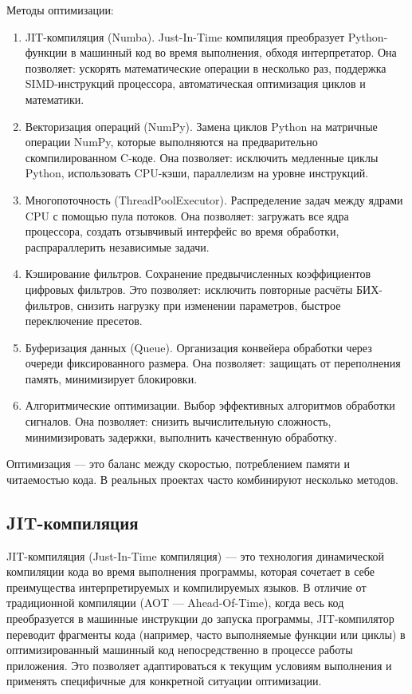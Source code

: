 Методы оптимизации:
\begin{enumerate}
	\item JIT-компиляция (Numba). Just-In-Time компиляция преобразует Python-функции в машинный код во время выполнения, обходя интерпретатор. Она позволяет: ускорять математические операции в несколько раз, поддержка SIMD-инструкций процессора, автоматическая оптимизация циклов и математики.
	\item Векторизация операций (NumPy). Замена циклов Python на матричные операции NumPy, которые выполняются на предварительно скомпилированном C-коде. Она позволяет: исключить медленные циклы Python, использовать CPU-кэши, параллелизм на уровне инструкций.
	\item Многопоточность (ThreadPoolExecutor). Распределение задач между ядрами CPU с помощью пула потоков. Она позволяет: загружать все ядра процессора, создать отзывчивый интерфейс во время обработки, распрараллерить независимые задачи.
	\item Кэширование фильтров. Сохранение предвычисленных коэффициентов цифровых фильтров. Это позволяет: исключить повторные расчёты БИХ-фильтров, снизить нагрузку при изменении параметров, быстрое переключение пресетов.
	\item Буферизация данных (Queue). Организация конвейера обработки через очереди фиксированного размера. Она позволяет: защищать от переполнения память, минимизирует блокировки.
	\item Алгоритмические оптимизации. Выбор эффективных алгоритмов обработки сигналов. Она позволяет: снизить вычислительную сложность, минимизировать задержки, выполнить качественную обработку.
\end{enumerate}

Оптимизация — это баланс между скоростью, потреблением памяти и читаемостью кода. В реальных проектах часто комбинируют несколько методов.

\subsection{JIT-компиляция}

JIT-компиляция (Just-In-Time компиляция) — это технология динамической компиляции кода во время выполнения программы, которая сочетает в себе преимущества интерпретируемых и компилируемых языков. В отличие от традиционной компиляции (AOT — Ahead-Of-Time), когда весь код преобразуется в машинные инструкции до запуска программы, JIT-компилятор переводит фрагменты кода (например, часто выполняемые функции или циклы) в оптимизированный машинный код непосредственно в процессе работы приложения. Это позволяет адаптироваться к текущим условиям выполнения и применять специфичные для конкретной ситуации оптимизации.

